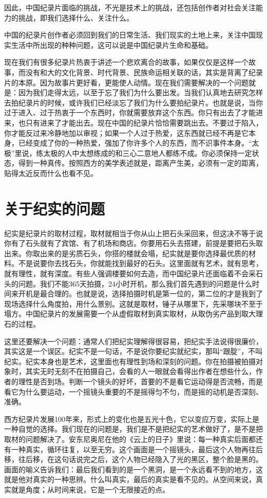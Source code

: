 因此，中国纪录片面临的挑战，不光是技术上的挑战，还包括创作者对社会关注能力的挑战，即我们选择什么、关注什么。

中国的纪录片创作者必须回到我们的日常生活、我们现实的土地上来，关注中国现实生活中所出现的种种问题，这可以说是中国纪录片生命和基础。

现在我们有很多纪录片热衷于讲述一个悲欢离合的故事，如果仅仅是这样一个故事，而没有和大的文化背景、时代背景、民族命运相关联的话，其实是背离了纪录片的本原。因为故事片更好看，更能使人动情。现在我们需要解决的一个问题就是：因为我们走得太远，以至于忘了我们为什么要出发。当我们认真地去研究怎样去拍纪录片的时候，或许我们已经淡忘了我们为什么要拍纪录片。也就是说，当你过于进入、过于热衷于一个东西时，你就需要放弃这个东西。你只有出去了才能进来，也只有进来了才能出去。现在中国的纪录片恰恰需要跳出去。不要过于陷入，你才能反过来冷静地加以审视；如果一个人过于热爱，这东西就已经不再是它本身，已经变成了你的一种热爱，强加了你许多个人的东西，而不识事件本身。“太极”里说，练太极的人中太想练成的和三心二意地人都练不成。你必须保持一定状态，得到一种真传。按照西方的美学表述就是，距离产生美，必须有一定的距离，贴得太近反而什么也看不见。

\section{关于纪实的问题}

纪实是纪录片的取材过程，取材就相当于你从山上把石头采回来，但这决不等于说你有了石头就有了宾馆、有了机场和商店。你要用石头去搭建，前提是要把石头取出来。你取出来的是劣质石头，你搭的楼就会塌，纪实就是要你选择最优质的材料。不是说要你去找石头，你就能找到最好的石头。这里面就有艺术，就有思考，就有理性，就有深度。有些人强调楼要如何去造，而中国纪录片还面临着不会采石头的问题。我们不能365天拍摄，24小时开机，那么我们首先遇到的问题是什么时间来开机是最合理的。也就是说，选择拍摄时机是第一位的，第二位的才是我到了现场选择什么角度拍，用什么景别。这就是取材，锤子从哪里下，先采哪块不至于塌方。中国纪录片的发展需要一个从虚假取材到真实取材，从取伪劣产品到取大理石的过程。

这里还要解决一个问题：通常人们把纪实理解得很容易，把纪实手法说得很廉价，其实这是一个误区。纪实不是一句话，不是说你要纪实就纪实，那叫“跟腚”，不叫纪实。纪实本身也是艺术，这里面也有理性到场和深刻的问题。你在拍摄被拍摄对象时，其实无时无刻不在拍摄自己，会看的人一眼就会看得出作者在想些什么，作者的理性是否到场。判断一个镜头的好坏，首要的不是看它运动得是否流畅，而是看它为什么要运动，一个摇镜头重要的不是摇得匀不匀，而是摇的动机是否深刻、准确。

西方纪录片发展100年来，形式上的变化也是五光十色，它以变应万变，实际上是一种自觉的选择。我们现在的问题是，我们是不是把纪实的艺术做好了，是不是把取材的问题解决了。安东尼奥尼在他的《云上的日子》里说：每一种真实后面都还有一种真实，循环往复，以至无穷。这个画面是一个摇镜头，最后这个人物再往后移，往后移，在这句话说完之后，这个人物已经隐入了光的黑区，整个脸是黑的。画面的喻义告诉我们：最后我们看到的是一个黑洞，是一个永远看不到的地方，这就是他对真实的一种思辨。什么叫真实，最后的真实是看不见的。从空间来说，真实就是角度；从时间来说，它是一个无限接近的点。


